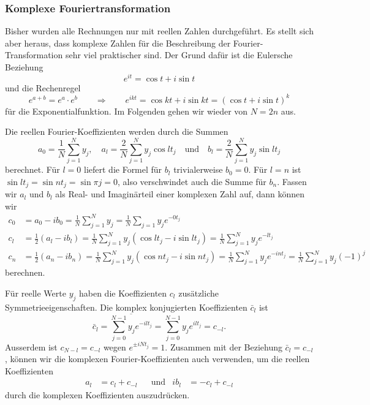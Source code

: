 %
%
%
\subsubsection{Komplexe Fouriertransformation}
Bisher wurden alle Rechnungen nur mit reellen Zahlen durchgeführt.
Es stellt sich aber heraus, dass komplexe Zahlen für die Beschreibung
der Fourier-Transformation sehr viel praktischer sind.
Der Grund dafür ist die Eulersche Beziehung
\[
e^{it} = \cos t + i \sin t
\]
und die Rechenregel
\[
e^{a+b}=e^a\cdot e^b
\qquad\Rightarrow\qquad
e^{ikt}=\cos kt+i\sin kt = (\cos t + i \sin t)^k
\]
für die Exponentialfunktion.
Im Folgenden gehen wir wieder von $N=2n$ aus.

Die reellen Fourier-Koeffizienten werden durch die Summen
\[
a_0
=
\frac{1}{N}\sum_{j=1}^N y_j,\quad
a_l
=
\frac{2}{N}\sum_{j=1}^N y_j \cos lt_j
\quad\text{und}\quad
b_l
=
\frac{2}{N}\sum_{j=1}^N y_j \sin lt_j
\]
berechnet.
Für $l=0$ liefert die Formel für $b_l$ trivialerweise $b_0=0$.
Für $l=n$ ist $\sin lt_j = \sin nt_j = \sin \pi j=0$, also verschwindet auch
die Summe für $b_n$.
Fassen wir $a_l$ und $b_l$ als Real- und Imaginärteil einer komplexen
Zahl auf, dann können wir 
\begin{align}
c_0
&=
a_0-ib_0
=
\frac{1}{N}
\sum_{j=1}^N y_j
=
\frac{1}{N}
\sum_{j=1} y_j e^{-0t_j}
\label{skript:complex:c0}
\\
c_l
&=
\frac12(a_l-ib_l)
=
\frac{1}{N} \sum_{j=1}^N y_j (\cos lt_j - i \sin lt_j)
=
\frac1{N} \sum_{j=1}^N y_j e^{-lt_j}
\label{skript:complex:cl}
\\
c_n
&=
\frac12(a_n-ib_n)
=
\frac{1}{N} \sum_{j=1}^N y_j (\cos nt_j  -i\sin nt_j)
=
\frac{1}{N} \sum_{j=1}^N y_j e^{-int_j}
=
\frac{1}{N} \sum_{j=1}^N y_j (-1)^j
\label{skript:complex:cn}
\end{align}
berechnen.

Für reelle Werte $y_j$ haben die Koeffizienten $c_l$ zusätzliche
Symmetrieeigenschaften.
Die komplex konjugierten Koeffizienten $\bar c_l$ ist
\[
\bar c_l
=
\overline{\sum_{j=0}^{N-1} y_j e^{-ilt_j}}
=
\sum_{j=0}^{N-1} y_j e^{ilt_j}
=
c_{-l}.
\]
Ausserdem ist $c_{N-l}=c_{-l}$ wegen $e^{\pm iNt_j}=1$.
Zusammen mit der Beziehung $\bar c_l=c_{-l}$, können wir die komplexen
Fourier-Koeffizienten auch verwenden, um die reellen Koeffizienten
\begin{equation}
\begin{aligned}
a_l
&=
c_l + c_{-l}
&&\text{und}&
ib_l
&=
-c_l + c_{-l}
\end{aligned}
\end{equation}
durch die komplexen Koeffizienten auszudrücken.

